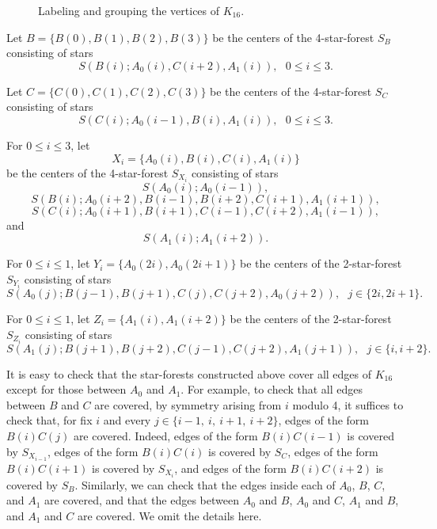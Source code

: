 \documentclass{article}
\begin{document}
\begin{figure}[h]
	\centering
        \caption{Labeling and grouping the vertices of $K_{16}$.}
\end{figure}
 
Let $B=\{B(0),B(1),B(2),B(3)\}$ be the centers of the 4-star-forest $S_{B}$ consisting of stars
$$
S (B(i); A_0(i), C(i+2), A_1(i) ),~~~0\le i\le 3.
$$

Let $C=\{C(0),C(1),C(2),C(3)\}$ be the centers of the 4-star-forest $S_{C}$ consisting of stars
$$
S (C(i); A_0(i-1), B(i), A_1(i) ),~~~0\le i\le 3.
$$

For $0\le i\le 3$, let 
$$X_i=\{A_0(i), B(i), C(i), A_1(i)\}$$
be the centers of the 4-star-forest $S_{X_i}$ consisting of stars
$$
S (A_0(i); A_0(i-1) ),
$$
$$
S (B(i); A_0(i+2), B(i-1), B(i+2), C(i+1), A_1(i+1) ),
$$
$$
S (C(i); A_0(i+1), B(i+1), C(i-1), C(i+2), A_1(i-1) ),
$$
and
$$
S (A_1(i); A_1(i+2) ).
$$

For $0\le i\le 1$, let $Y_i=\{A_0(2i),A_0(2i+1)\}$ be the centers of the 2-star-forest $S_{Y_i}$ consisting of stars
$$
S (A_0(j); B(j-1), B(j+1), C(j), C(j+2), A_0(j+2) ),~~~j\in\{2i,2i+1\}.
$$

For $0\le i\le 1$, let $Z_i=\{A_1(i),A_1(i+2)\}$ be the centers of the 2-star-forest $S_{Z_i}$ consisting of stars
$$
S (A_1(j); B(j+1), B(j+2), C(j-1), C(j+2), A_1(j+1) ),~~~j\in\{i,i+2\}.
$$

It is easy to check that the star-forests constructed above cover all edges of $K_{16}$ except for those between $A_0$ and $A_1$. For example, to check that all edges between $B$ and $C$ are covered, by symmetry arising from $i$ modulo 4, it suffices to check that, for fix $i$ and every $j\in \{i-1,~i,~i+1,~i+2\}$, edges of the form $B(i)C(j)$ are covered. Indeed, edges of the form $B(i)C(i-1)$ is covered by $S_{X_{i-1}}$, edges of the form $B(i)C(i)$ is covered by $S_C$, edges of the form $B(i)C(i+1)$ is covered by $S_{X_i}$, and edges of the form $B(i)C(i+2)$ is covered by $S_B$. Similarly, we can check that the edges inside each of $A_0$, $B$, $C$, and $A_1$ are covered, and that the edges between $A_0$ and $B$, $A_0$ and $C$, $A_1$ and $B$, and $A_1$ and $C$ are covered. 
We omit the details here.
\end{document}

